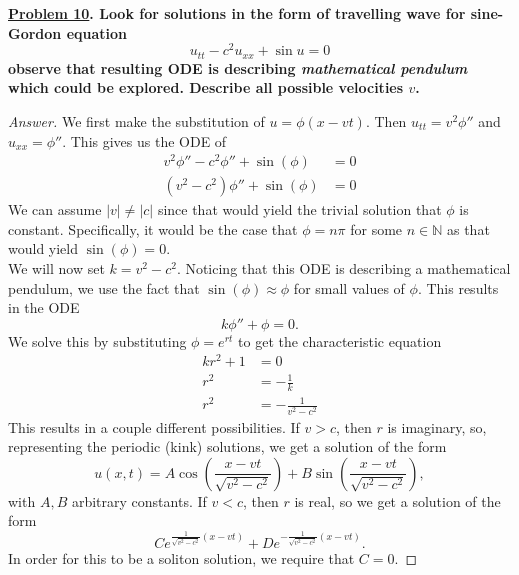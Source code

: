 \documentclass{article}
\theoremstyle{definition}
\renewcommand\qedsymbol{$\blacksquare$}
\newenvironment{ans}{\begin{proof}[Answer]\renewcommand{\qedsymbol}{}}{\end{proof}}
\newenvironment{boldenv}{\bfseries\boldmath}{}
\newcommand{\N}{\mathbb{N}}
\begin{document}
\begin{boldenv}
    \underline{Problem 10}. Look for solutions in the form of travelling wave for sine-Gordon equation
    \[u_{tt}-c^2u_{xx}+\sin{u} = 0\]
    observe that resulting ODE is describing \textit{mathematical pendulum} which could be explored. Describe all possible velocities $v$.
\end{boldenv}
\begin{ans}
    We first make the substitution of $u = \phi(x-vt)$. Then $u_{tt} = v^2\phi''$ and $u_{xx} = \phi''$. This gives us the ODE of
    \begin{align*}
        v^2\phi'' - c^2\phi'' + \sin(\phi) &= 0\\
        (v^2 - c^2)\phi'' + \sin(\phi) &= 0
    \end{align*}
    We can assume $|v|\neq |c|$ since that would yield the trivial solution that $\phi$ is constant. Specifically, it would be the case that $\phi = n\pi$ for some $n\in\N$ as that would yield $\sin(\phi) = 0$.\\

    We will now set $k = v^2 - c^2$. Noticing that this ODE is describing a mathematical pendulum, we use the fact that $\sin(\phi) \approx \phi$ for small values of $\phi$. This results in the ODE
    \[k\phi'' + \phi = 0.\]
    We solve this by substituting $\phi = e^{rt}$ to get the characteristic equation
    \begin{align*}
        kr^2 + 1 &= 0\\
        r^2 &= -\frac{1}{k}\\
        r^2 &= -\frac{1}{v^2 - c^2}
    \end{align*}
    This results in a couple different possibilities. If $v > c$, then $r$ is imaginary, so, representing the periodic (kink) solutions, we get a solution of the form
    \[\boxed{u(x,t) = A \cos\left(\frac{x-vt}{\sqrt{v^2-c^2}}\right) + B \sin\left(\frac{x-vt}{\sqrt{v^2-c^2}}\right)},\]
    with $A, B$ arbitrary constants. If $v < c$, then $r$ is real, so we get a solution of the form
    \[\boxed{Ce^{\frac{1}{\sqrt{v^2-c^2}}(x-vt)} + De^{-\frac{1}{\sqrt{v^2-c^2}}(x-vt)}}.\]
    In order for this to be a soliton solution, we require that $C = 0$.
    
\end{ans}
\end{document}
